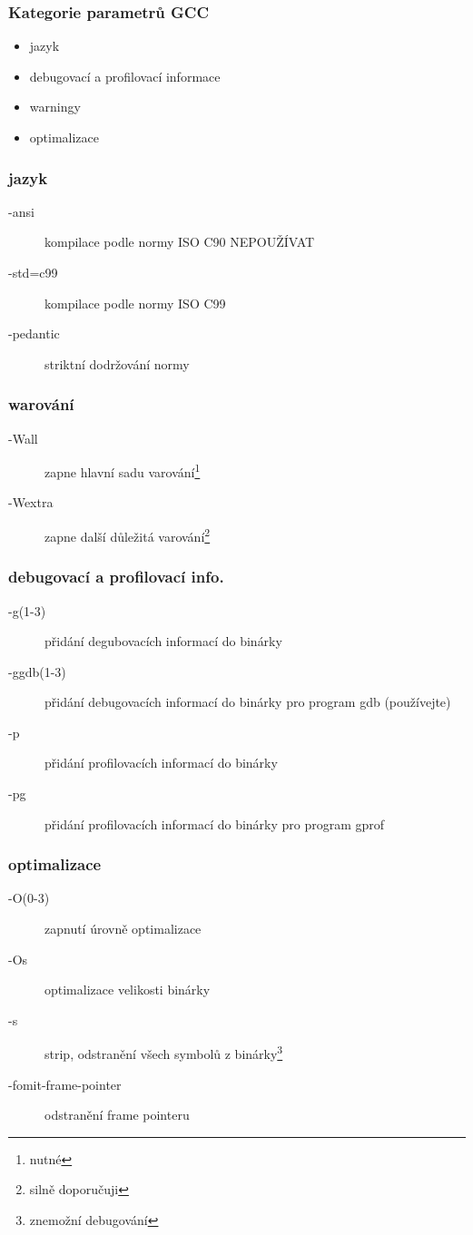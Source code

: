 \begin{frame}
	\frametitle{Kategorie parametrů GCC}
	\begin{itemize}
		\item{jazyk}
		\item{debugovací a profilovací informace}
		\item{warningy}
		\item{optimalizace}
	\end{itemize}
\end{frame}

\begin{frame}
	\frametitle{jazyk}
	\begin{description}
		\item[-ansi]{kompilace podle normy ISO C90 \alert{NEPOUŽÍVAT}}
		\item[-std=c99]{kompilace podle normy ISO C99}
		\item[-pedantic]{striktní dodržování normy}
	\end{description}
\end{frame}

\begin{frame}
	\frametitle{warování}
	\begin{description}
		\item[-Wall]{zapne hlavní sadu varování\footnote{\alert{nutné}}}
		\item[-Wextra]{zapne další důležitá varování\footnote{silně doporučuji}} 
	\end{description}
\end{frame}

\begin{frame}
	\frametitle{debugovací a profilovací info.}
	\begin{description}
		\item[-g(1-3)]{přidání degubovacích informací do binárky}
		\item[-ggdb(1-3)]{přidání debugovacích informací do binárky pro program gdb (používejte)}
		\item[-p]{přidání profilovacích informací do binárky}
		\item[-pg]{přidání profilovacích informací do binárky pro program gprof}
	\end{description}
\end{frame}

\begin{frame}
	\frametitle{optimalizace}
	\begin{description}
		\item[-O(0-3)]{zapnutí úrovně optimalizace}
		\item[-Os]{optimalizace velikosti binárky}
		\item[-s]{strip, odstranění všech symbolů z binárky\footnote[1]{\alert{znemožní debugování}}}
		\item[-fomit-frame-pointer]{odstranění frame pointeru\footnotemark[1]}
	\end{description}
\end{frame}

